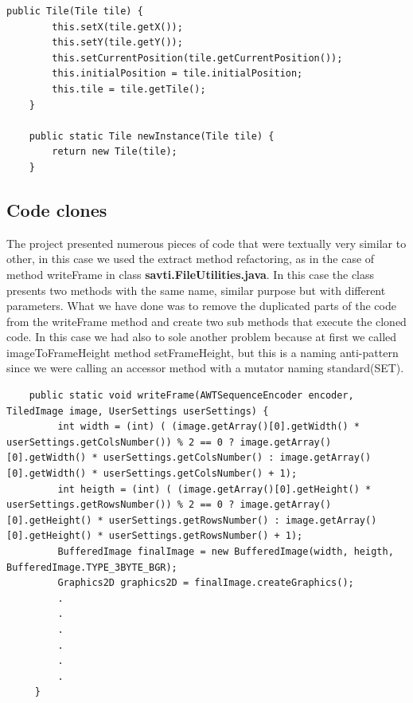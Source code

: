 \documentclass{article}
\begin{document}
    \begin{lstlisting}[caption={Clone Factory Method},captionpos =b]
     public Tile(Tile tile) {
        this.setX(tile.getX());
        this.setY(tile.getY());
        this.setCurrentPosition(tile.getCurrentPosition());
        this.initialPosition = tile.initialPosition;
        this.tile = tile.getTile();
    }

    public static Tile newInstance(Tile tile) {
        return new Tile(tile);
    }
\end{lstlisting}
\newpage
\subsection{Code clones}
The project presented numerous pieces of code that were textually very similar to other, in this case we used the extract method refactoring, as in the case of method writeFrame in class \textbf{savti.FileUtilities.java}.
In this case the class presents two methods with the same name, similar purpose but with different parameters. What we have done was to remove the duplicated parts of the code from the writeFrame method and create two sub methods that execute the cloned code.
In this case we had also to sole another problem because at first we called imageToFrameHeight method setFrameHeight, but this is a naming anti-pattern since we were calling an accessor method with a mutator naming standard(SET).\\
\begin{minipage}{0.5 \textwidth}
\begin{lstlisting}
    public static void writeFrame(AWTSequenceEncoder encoder, TiledImage image, UserSettings userSettings) {
         int width = (int) ( (image.getArray()[0].getWidth() * userSettings.getColsNumber()) % 2 == 0 ? image.getArray()[0].getWidth() * userSettings.getColsNumber() : image.getArray()[0].getWidth() * userSettings.getColsNumber() + 1);
         int heigth = (int) ( (image.getArray()[0].getHeight() * userSettings.getRowsNumber()) % 2 == 0 ? image.getArray()[0].getHeight() * userSettings.getRowsNumber() : image.getArray()[0].getHeight() * userSettings.getRowsNumber() + 1);
         BufferedImage finalImage = new BufferedImage(width, heigth, BufferedImage.TYPE_3BYTE_BGR);
         Graphics2D graphics2D = finalImage.createGraphics();
         .
         .
         .
         .
         .
         .
     }
\end{lstlisting}
\end{minipage}
\end{document}
